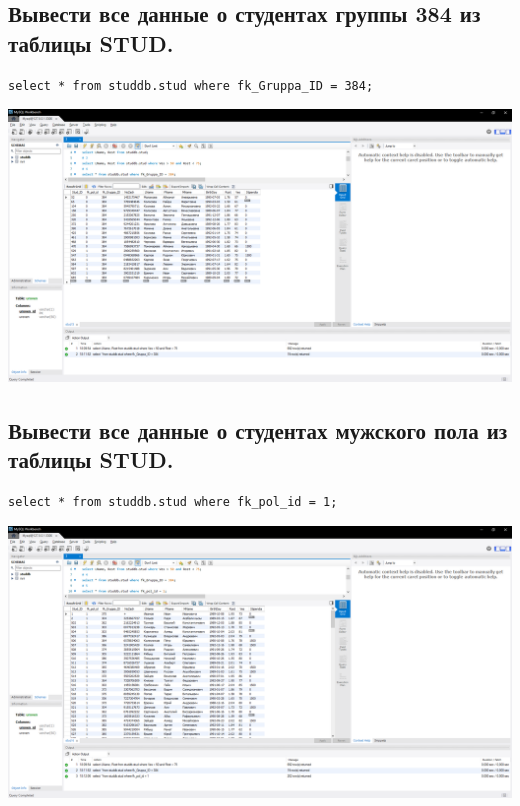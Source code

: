 \documentclass[a4paper, 12pt]{article}
\begin{document}
\subsection{Вывести все данные о студентах  группы 384 из таблицы STUD.}
\begin{lstlisting}
select * from studdb.stud where fk_Gruppa_ID = 384;  
\end{lstlisting}
\includegraphics[width=\textwidth]{5-4.png}

\subsection{Вывести все данные о студентах  мужского пола из таблицы STUD.}
\begin{lstlisting}
select * from studdb.stud where fk_pol_id = 1;  
\end{lstlisting}
\includegraphics[width=\textwidth]{5-5.png}
\end{document}
